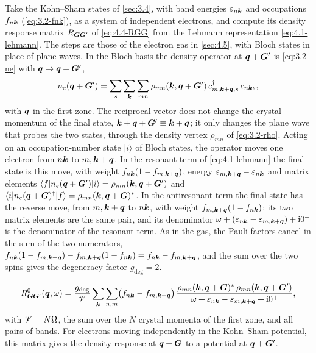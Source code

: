Take the Kohn--Sham states of \cref{sec:3.4}, with band energies $\varepsilon_{n\bm{k}}$ and occupations $f_{n\bm{k}}$ (\cref{eq:3.2-fnk}), as a system of independent electrons, and compute its density response matrix $R_{\bm{G}\bm{G}'}$ of \cref{eq:4.4-RGG} from the Lehmann representation \cref{eq:4.1-lehmann}. The steps are those of the electron gas in \cref{sec:4.5}, with Bloch states in place of plane waves. In the Bloch basis the density operator at $\bm{q} + \bm{G}'$ is \cref{eq:3.2-ne} with $\bm{q} \to \bm{q} + \bm{G}'$,
\begin{equation*}
  n_e(\bm{q}+\bm{G}') = \sum_s\sum_{\bm{k}}\sum_{mn}\rho_{mn}(\bm{k},\bm{q}+\bm{G}')\,c^\dagger_{m,\bm{k}+\bm{q},s}\,c_{n\bm{k}s} ,
\end{equation*}
with $\bm{q}$ in the first zone. The reciprocal vector does not change the crystal momentum of the final state, $\bm{k} + \bm{q} + \bm{G}' \equiv \bm{k} + \bm{q}$; it only changes the plane wave that probes the two states, through the density vertex $\rho_{mn}$ of \cref{eq:3.2-rho}. Acting on an occupation-number state $|i\rangle$ of Bloch states, the operator moves one electron from $n\bm{k}$ to $m,\bm{k}+\bm{q}$. In the resonant term of \cref{eq:4.1-lehmann} the final state is this move, with weight $f_{n\bm{k}}(1 - f_{m,\bm{k}+\bm{q}})$, energy $\varepsilon_{m,\bm{k}+\bm{q}} - \varepsilon_{n\bm{k}}$ and matrix elements $\langle f|n_e(\bm{q}+\bm{G}')|i\rangle = \rho_{mn}(\bm{k},\bm{q}+\bm{G}')$ and $\langle i|n_e(\bm{q}+\bm{G})^\dagger|f\rangle = \rho_{mn}(\bm{k},\bm{q}+\bm{G})^*$. In the antiresonant term the final state has the reverse move, from $m,\bm{k}+\bm{q}$ to $n\bm{k}$, with weight $f_{m,\bm{k}+\bm{q}}(1 - f_{n\bm{k}})$; its two matrix elements are the same pair, and its denominator $\omega + (\varepsilon_{n\bm{k}} - \varepsilon_{m,\bm{k}+\bm{q}}) + \mathrm{i}0^+$ is the denominator of the resonant term. As in the gas, the Pauli factors cancel in the sum of the two numerators, $f_{n\bm{k}}(1 - f_{m,\bm{k}+\bm{q}}) - f_{m,\bm{k}+\bm{q}}(1 - f_{n\bm{k}}) = f_{n\bm{k}} - f_{m,\bm{k}+\bm{q}}$, and the sum over the two spins gives the degeneracy factor $g_{\mathrm{deg}} = 2$.
\begin{keyresult}
\begin{equation}
  R^0_{\bm{G}\bm{G}'}(\bm{q},\omega) = \frac{g_{\mathrm{deg}}}{\mathscr{V}}\sum_{\bm{k}}\sum_{n,m}
  \bigl(f_{n\bm{k}} - f_{m,\bm{k}+\bm{q}}\bigr)\,
  \frac{\rho_{mn}(\bm{k},\bm{q}+\bm{G})^*\,\rho_{mn}(\bm{k},\bm{q}+\bm{G}')}{\omega + \varepsilon_{n\bm{k}} - \varepsilon_{m,\bm{k}+\bm{q}} + \mathrm{i}0^+} ,
  \label{eq:4.6-R0}
\end{equation}
with $\mathscr{V} = N\Omega$, the sum over the $N$ crystal momenta of the first zone, and all pairs of bands. For electrons moving independently in the Kohn--Sham potential, this matrix gives the density response at $\bm{q} + \bm{G}$ to a potential at $\bm{q} + \bm{G}'$.
\end{keyresult}
